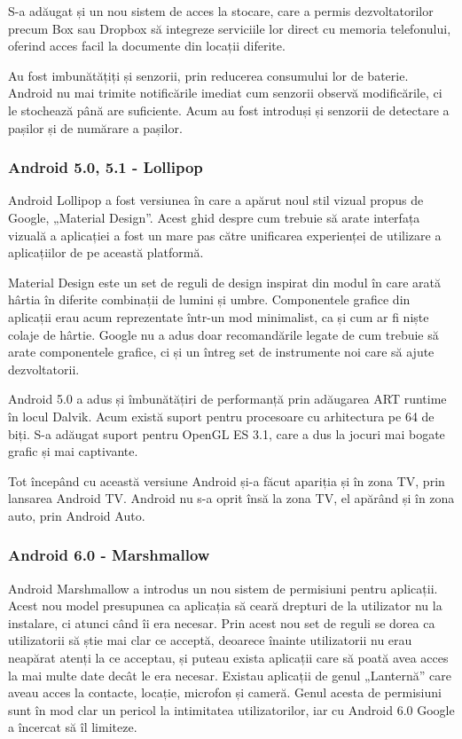 \documentclass[12pt,a4paper]{article}
\begin{document}
	S-a adăugat și un nou sistem de acces la stocare, care a permis dezvoltatorilor precum Box sau Dropbox să integreze serviciile lor direct cu memoria telefonului, oferind acces facil la documente din locații diferite.

	Au fost imbunătățiți și senzorii, prin reducerea consumului lor de baterie. Android nu  mai trimite notificările imediat cum senzorii observă modificările, ci le stochează până are suficiente.  Acum au fost introduși și senzorii de detectare a pașilor și de numărare a pașilor. 
	

\subsubsection{Android 5.0, 5.1 - Lollipop}
Android Lollipop a fost versiunea în care a apărut noul stil vizual propus de Google, „Material Design”. Acest ghid despre cum trebuie să arate interfața vizuală a aplicației a fost un mare pas către unificarea experienței de utilizare a aplicațiilor de pe această platformă.
	
	Material Design este un set de reguli de design inspirat din modul în care arată hârtia în diferite combinații de lumini și umbre.
Componentele grafice din aplicații erau acum reprezentate într-un mod minimalist, ca și cum ar fi niște colaje de hârtie. Google nu a adus doar recomandările legate de cum trebuie să arate componentele grafice, ci și un întreg set de instrumente noi care să ajute dezvoltatorii.
	
	Android 5.0 a adus și îmbunătățiri de performanță prin adăugarea ART runtime în locul Dalvik. Acum există suport pentru procesoare cu arhitectura pe 64 de biți. S-a adăugat suport pentru OpenGL ES 3.1, care a dus la jocuri mai bogate grafic și mai captivante.
	
	Tot începând cu această versiune Android și-a făcut apariția și în zona TV, prin lansarea Android TV. Android nu s-a oprit însă la zona TV, el apărând și în zona auto, prin Android Auto.

	
\subsubsection{Android 6.0 - Marshmallow}
Android Marshmallow a introdus un nou sistem de permisiuni pentru aplicații. Acest nou model presupunea ca aplicația să ceară drepturi de la utilizator nu la instalare, ci atunci când îi era necesar. Prin acest nou set de reguli se dorea ca utilizatorii să știe mai clar ce acceptă, deoarece înainte utilizatorii nu erau neapărat atenți la ce acceptau, și puteau exista aplicații care să poată avea acces la mai multe date decât le era necesar. Existau aplicații de genul „Lanternă” care aveau acces la contacte, locație, microfon și cameră. Genul acesta de permisiuni sunt în mod clar un pericol la intimitatea utilizatorilor, iar cu Android 6.0 Google a încercat să îl limiteze.
\end{document}
